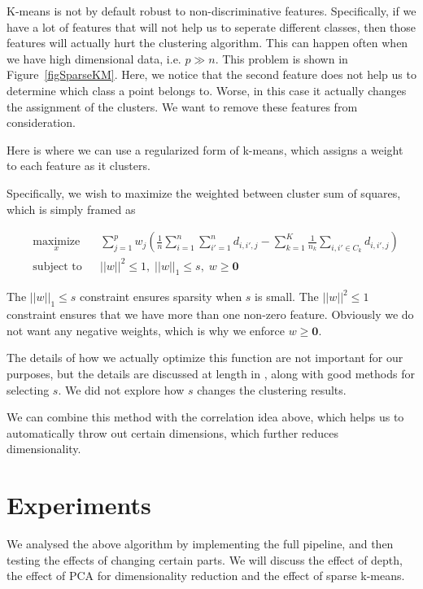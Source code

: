 \documentclass{article} %
\begin{document}
K-means is not by default robust to non-discriminative features. Specifically, if we have a lot of features that will not help us to seperate different classes, then those features will actually hurt the clustering algorithm. This can happen often when we have high dimensional data, i.e. $p \gg n$. This problem is shown in Figure~\ref{figSparseKM}. Here, we notice that the second feature does not help us to determine which class a point belongs to. Worse, in this case it actually changes the assignment of the clusters. We want to remove these features from consideration.

Here is where we can use a regularized form of k-means, which assigns a weight to each feature as it clusters.

Specifically, we wish to maximize the weighted between cluster sum of squares, which is simply framed as

\begin{equation}
\begin{aligned}
& \underset{x}{\text{maximize}}
& & \sum_{j=1}^p w_j\left(\frac{1}{n}\sum_{i=1}^n\sum_{i'=1}^nd_{i, i', j}-\sum_{k=1}^K \frac{1}{n_k}\sum_{i, i'\in C_k} d_{i, i', j}\right) \\
& \text{subject to}
& & ||w||^2 \leq 1, \; ||w||_1\leq s, \; w \geq \mathbf{0}
\end{aligned}
\end{equation}

The $||w||_1 \leq s$ constraint ensures sparsity when $s$ is small. The $||w||^2 \leq 1$ constraint ensures that we have more than one non-zero feature. Obviously we do not want any negative weights, which is why we enforce $w \geq \mathbf{0}$.

The details of how we actually optimize this function are not important for our purposes, but the details are discussed at length in \cite{tibs10}, along with good methods for selecting $s$. We did not explore how $s$ changes the clustering results.

We can combine this method with the correlation idea above, which helps us to automatically throw out certain dimensions, which further reduces dimensionality.

\section{Experiments}

We analysed the above algorithm by implementing the full pipeline, and then testing the effects of changing certain parts. We will discuss the effect of depth, the effect of PCA for dimensionality reduction and the effect of sparse k-means.
\end{document}

